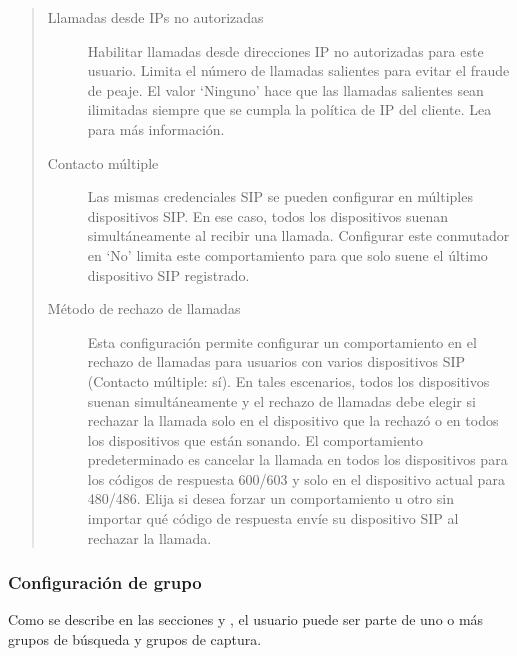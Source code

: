 \documentclass[letterpaper,10pt,spanish]{sphinxmanual}
\begin{document}
\begin{quote}
\begin{description}
\item[{Llamadas desde IPs no autorizadas}] \leavevmode
Habilitar llamadas desde direcciones IP no autorizadas para este usuario. Limita el número de llamadas salientes para evitar el fraude de peaje. El valor `Ninguno' hace que las llamadas salientes sean ilimitadas siempre que se cumpla la política de IP del cliente. Lea {\hyperref[security_and_maintenance/security/authorized_ip_ranges:roadwarrior\string-users]{}} para más información.

\item[{Contacto múltiple}] \leavevmode
Las mismas credenciales SIP se pueden configurar en múltiples dispositivos SIP. En ese caso, todos los dispositivos suenan simultáneamente al recibir una llamada. Configurar este conmutador en `No' limita este comportamiento para que solo suene el último dispositivo SIP registrado.

\item[{Método de rechazo de llamadas}] \leavevmode
Esta configuración permite configurar un comportamiento en el rechazo de llamadas para usuarios con varios dispositivos SIP (Contacto múltiple: sí). En tales escenarios, todos los dispositivos suenan simultáneamente y el rechazo de llamadas debe elegir si rechazar la llamada solo en el dispositivo que la rechazó o en todos los dispositivos que están sonando. El comportamiento predeterminado es cancelar la llamada en todos los dispositivos para los códigos de respuesta 600/603 y solo en el dispositivo actual para 480/486. Elija si desea forzar un comportamiento u otro sin importar qué código de respuesta envíe su dispositivo SIP al rechazar la llamada.

\end{description}
\end{quote}


\subsubsection{Configuración de grupo}
\label{administration_portal/client/vpbx/users:group-configuration}
Como se describe en las secciones {\hyperref[administration_portal/client/vpbx/routing_endpoints/hunt_groups:huntgroups]{}} y {\hyperref[administration_portal/client/vpbx/user_configuration/pick_up_groups:capture\string-groups]{}}, el usuario puede ser parte de uno o más grupos de búsqueda y grupos de captura.
\end{document}
